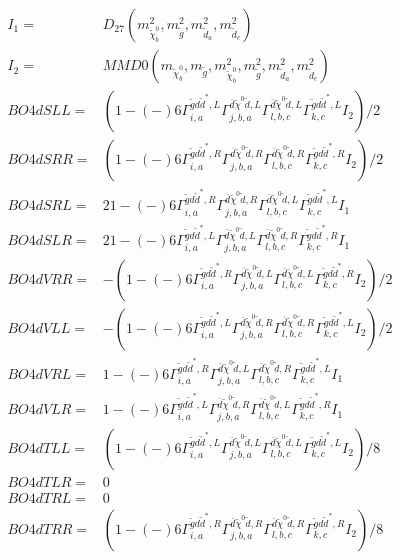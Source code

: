 \documentclass[A4,landscape]{article}
\begin{document}
\begin{align} 
I_1 = & D_{27}(m^2_{\tilde{\chi}^0_{{b}}}, m^2_{\tilde{g}}, m^2_{\tilde{d}_{{a}}}, m^2_{\tilde{d}_{{c}}}) \\ 
I_2 = & MMD0(m_{\tilde{\chi}^0_{{b}}}, m_{\tilde{g}}, m^2_{\tilde{\chi}^0_{{b}}}, m^2_{\tilde{g}}, m^2_{\tilde{d}_{{a}}}, m^2_{\tilde{d}_{{c}}}) \\ 
  BO4dSLL= & (  1
-(-)
  6 \Gamma^{\tilde{g} d \tilde{d}^*,L}_{i, a} \Gamma^{\bar{d}\tilde{\chi}^0 \tilde{d} ,L}_{j, b, a} \Gamma^{\bar{d}\tilde{\chi}^0 \tilde{d} ,L}_{l, b, c} \Gamma^{\tilde{g} d \tilde{d}^*,L}_{k, c} I_2)/2 \\ 
  BO4dSRR= & (  1
-(-)
  6 \Gamma^{\tilde{g} d \tilde{d}^*,R}_{i, a} \Gamma^{\bar{d}\tilde{\chi}^0 \tilde{d} ,R}_{j, b, a} \Gamma^{\bar{d}\tilde{\chi}^0 \tilde{d} ,R}_{l, b, c} \Gamma^{\tilde{g} d \tilde{d}^*,R}_{k, c} I_2)/2 \\ 
  BO4dSRL= & 2   1
-(-)
  6 \Gamma^{\tilde{g} d \tilde{d}^*,R}_{i, a} \Gamma^{\bar{d}\tilde{\chi}^0 \tilde{d} ,R}_{j, b, a} \Gamma^{\bar{d}\tilde{\chi}^0 \tilde{d} ,L}_{l, b, c} \Gamma^{\tilde{g} d \tilde{d}^*,L}_{k, c} I_1 \\ 
  BO4dSLR= & 2   1
-(-)
  6 \Gamma^{\tilde{g} d \tilde{d}^*,L}_{i, a} \Gamma^{\bar{d}\tilde{\chi}^0 \tilde{d} ,L}_{j, b, a} \Gamma^{\bar{d}\tilde{\chi}^0 \tilde{d} ,R}_{l, b, c} \Gamma^{\tilde{g} d \tilde{d}^*,R}_{k, c} I_1 \\ 
  BO4dVRR= & -(  1
-(-)
  6 \Gamma^{\tilde{g} d \tilde{d}^*,R}_{i, a} \Gamma^{\bar{d}\tilde{\chi}^0 \tilde{d} ,L}_{j, b, a} \Gamma^{\bar{d}\tilde{\chi}^0 \tilde{d} ,L}_{l, b, c} \Gamma^{\tilde{g} d \tilde{d}^*,R}_{k, c} I_2)/2 \\ 
  BO4dVLL= & -(  1
-(-)
  6 \Gamma^{\tilde{g} d \tilde{d}^*,L}_{i, a} \Gamma^{\bar{d}\tilde{\chi}^0 \tilde{d} ,R}_{j, b, a} \Gamma^{\bar{d}\tilde{\chi}^0 \tilde{d} ,R}_{l, b, c} \Gamma^{\tilde{g} d \tilde{d}^*,L}_{k, c} I_2)/2 \\ 
  BO4dVRL= &   1
-(-)
  6 \Gamma^{\tilde{g} d \tilde{d}^*,R}_{i, a} \Gamma^{\bar{d}\tilde{\chi}^0 \tilde{d} ,L}_{j, b, a} \Gamma^{\bar{d}\tilde{\chi}^0 \tilde{d} ,R}_{l, b, c} \Gamma^{\tilde{g} d \tilde{d}^*,L}_{k, c} I_1 \\ 
  BO4dVLR= &   1
-(-)
  6 \Gamma^{\tilde{g} d \tilde{d}^*,L}_{i, a} \Gamma^{\bar{d}\tilde{\chi}^0 \tilde{d} ,R}_{j, b, a} \Gamma^{\bar{d}\tilde{\chi}^0 \tilde{d} ,L}_{l, b, c} \Gamma^{\tilde{g} d \tilde{d}^*,R}_{k, c} I_1 \\ 
  BO4dTLL= & (  1
-(-)
  6 \Gamma^{\tilde{g} d \tilde{d}^*,L}_{i, a} \Gamma^{\bar{d}\tilde{\chi}^0 \tilde{d} ,L}_{j, b, a} \Gamma^{\bar{d}\tilde{\chi}^0 \tilde{d} ,L}_{l, b, c} \Gamma^{\tilde{g} d \tilde{d}^*,L}_{k, c} I_2)/8 \\ 
  BO4dTLR= & 0 \\ 
  BO4dTRL= & 0 \\ 
  BO4dTRR= & (  1
-(-)
  6 \Gamma^{\tilde{g} d \tilde{d}^*,R}_{i, a} \Gamma^{\bar{d}\tilde{\chi}^0 \tilde{d} ,R}_{j, b, a} \Gamma^{\bar{d}\tilde{\chi}^0 \tilde{d} ,R}_{l, b, c} \Gamma^{\tilde{g} d \tilde{d}^*,R}_{k, c} I_2)/8 \\ 
\end{align} 
\end{document}
